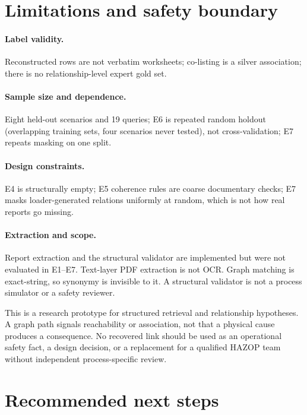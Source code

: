 \documentclass[10pt,twocolumn,a4paper]{extarticle}
\begin{document}
\section{Limitations and safety boundary}\label{ch:limits}

\paragraph{Label validity.} Reconstructed rows are not verbatim worksheets; co-listing is a silver association; there is no relationship-level expert gold set.
\paragraph{Sample size and dependence.} Eight held-out scenarios and 19 queries; E6 is repeated random holdout (overlapping training sets, four scenarios never tested), not cross-validation; E7 repeats masking on one split.
\paragraph{Design constraints.} E4 is structurally empty; E5 coherence rules are coarse documentary checks; E7 masks loader-generated relations uniformly at random, which is not how real reports go missing.
\paragraph{Extraction and scope.} Report extraction and the structural validator are implemented but were not evaluated in E1--E7. Text-layer PDF extraction is not OCR. Graph matching is exact-string, so synonymy is invisible to it. A structural validator is not a process simulator or a safety reviewer.

\begin{caution}
This is a research prototype for structured retrieval and relationship hypotheses. A graph path signals reachability or association, not that a physical cause produces a consequence. No recovered link should be used as an operational safety fact, a design decision, or a replacement for a qualified HAZOP team without independent process-specific review.
\end{caution}

\section{Recommended next steps}\label{ch:next}
\end{document}
